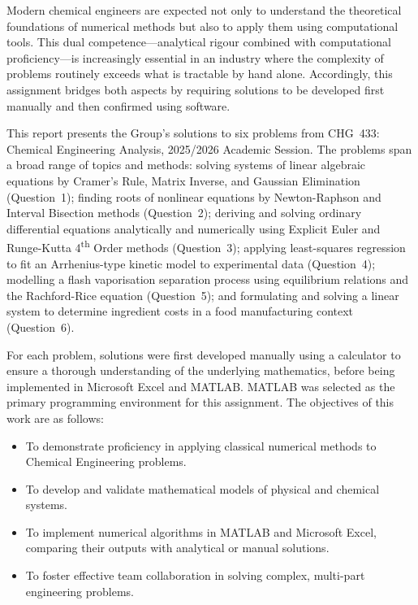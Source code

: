 \documentclass[12pt,a4paper]{article}
\begin{document}
Modern chemical engineers are expected not only to understand the theoretical foundations of
numerical methods but also to apply them using computational tools. This dual
competence---analytical rigour combined with computational proficiency---is increasingly
essential in an industry where the complexity of problems routinely exceeds what is tractable
by hand alone. Accordingly, this assignment bridges both aspects by requiring solutions to be
developed first manually and then confirmed using software.

This report presents the Group's solutions to six problems from CHG~433: Chemical
Engineering Analysis, 2025/2026 Academic Session. The problems span a broad range of
topics and methods: solving systems of linear algebraic equations by Cramer's Rule, Matrix
Inverse, and Gaussian Elimination (Question~1); finding roots of nonlinear equations by
Newton-Raphson and Interval Bisection methods (Question~2); deriving and solving ordinary
differential equations analytically and numerically using Explicit Euler and Runge-Kutta 4\textsuperscript{th}
Order methods (Question~3); applying least-squares regression to fit an Arrhenius-type kinetic
model to experimental data (Question~4); modelling a flash vaporisation separation process
using equilibrium relations and the Rachford-Rice equation (Question~5); and formulating and
solving a linear system to determine ingredient costs in a food manufacturing context
(Question~6).

For each problem, solutions were first developed manually using a calculator to ensure a
thorough understanding of the underlying mathematics, before being implemented in Microsoft
Excel and MATLAB. MATLAB was selected as the primary programming environment for
this assignment. The objectives of this work are as follows:

\begin{itemize}
  \item To demonstrate proficiency in applying classical numerical methods to Chemical
        Engineering problems.
  \item To develop and validate mathematical models of physical and chemical systems.
  \item To implement numerical algorithms in MATLAB and Microsoft Excel, comparing
        their outputs with analytical or manual solutions.
  \item To foster effective team collaboration in solving complex, multi-part engineering
        problems.
\end{itemize}
\end{document}
